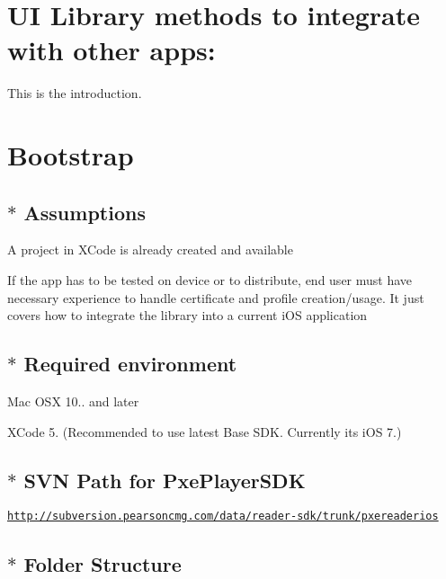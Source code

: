\hypertarget{index_intro_sec}{}\section{U\-I Library methods to integrate with other apps\-:}\label{index_intro_sec}
This is the introduction.\hypertarget{index_start_sec}{}\section{Bootstrap}\label{index_start_sec}
\hypertarget{index_step1}{}\subsection{$\ast$ Assumptions}\label{index_step1}

\begin{DoxyItemize}
\item A project in X\-Code is already created and available
\item If the app has to be tested on device or to distribute, end user must have necessary experience to handle certificate and profile creation/usage. It just covers how to integrate the library into a current i\-O\-S application
\end{DoxyItemize}\hypertarget{index_step2}{}\subsection{$\ast$ Required environment}\label{index_step2}

\begin{DoxyItemize}
\item Mac O\-S\-X 10.. and later
\item X\-Code 5. (Recommended to use latest Base S\-D\-K. Currently its i\-O\-S 7.)
\end{DoxyItemize}\hypertarget{index_step3}{}\subsection{$\ast$ S\-V\-N Path for Pxe\-Player\-S\-D\-K}\label{index_step3}
\href{http://subversion.pearsoncmg.com/data/reader-sdk/trunk/pxereaderios}{\tt http\-://subversion.\-pearsoncmg.\-com/data/reader-\/sdk/trunk/pxereaderios}\hypertarget{index_folder_structure}{}\subsection{$\ast$ Folder Structure}\label{index_folder_structure}


